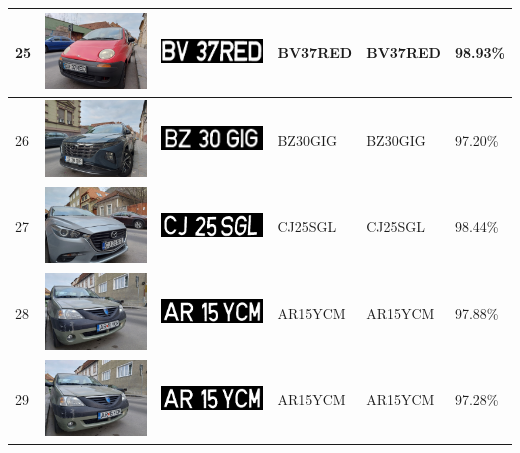 \documentclass[a4paper,12pt]{report}
\begin{document}
\begin{longtable}{| m{0.6cm} | m{3cm} | m{3cm} | m{1.8cm} | m{1.8cm} | m{1.8cm} |}
        25 & \includegraphics[width=3cm,keepaspectratio]{dataset/12_d2.jpg} & \includegraphics[width=3cm,keepaspectratio]{segmentari/25.jpg} & BV37RED & BV37RED & 98.93\% \\ \hline
        26 & \includegraphics[width=3cm,keepaspectratio]{dataset/13_d1.jpg} & \includegraphics[width=3cm,keepaspectratio]{segmentari/26.jpg} & BZ30GIG & BZ30GIG & 97.20\% \\ \hline
        27 & \includegraphics[width=3cm,keepaspectratio]{dataset/14_s1.jpg} & \includegraphics[width=3cm,keepaspectratio]{segmentari/27.jpg} & CJ25SGL & CJ25SGL & 98.44\% \\ \hline
        28 & \includegraphics[width=3cm,keepaspectratio]{dataset/15_s1.jpg} & \includegraphics[width=3cm,keepaspectratio]{segmentari/28.jpg} & AR15YCM & AR15YCM & 97.88\% \\ \hline
        29 & \includegraphics[width=3cm,keepaspectratio]{dataset/15_s2.jpg} & \includegraphics[width=3cm,keepaspectratio]{segmentari/29.jpg} & AR15YCM & AR15YCM & 97.28\% \\ \hline

\end{longtable}
\end{document}
